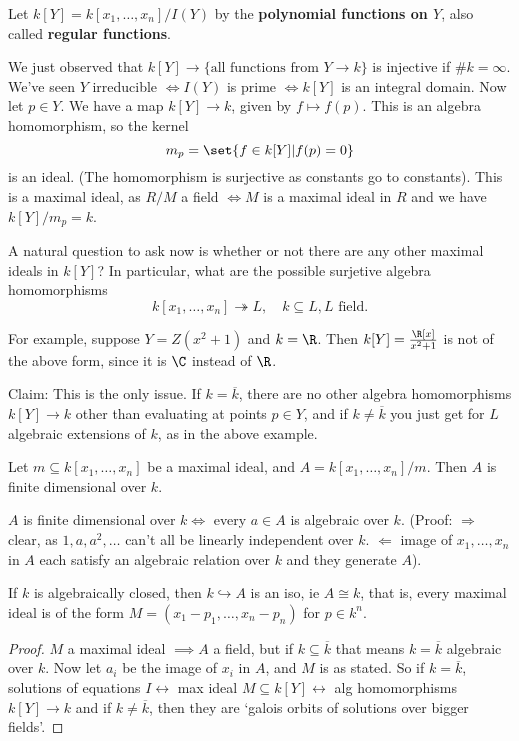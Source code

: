 \documentclass{article}
\begin{document}
\begin{defi}
    Let $k[Y] = k[x_1, \dotsc, x_n]/I(Y)$ by the \textbf{polynomial functions on $Y$}, also called \textbf{regular functions}.
\end{defi}
We just observed that $k[Y] \to \{\text{all functions from } Y \to k\}$ is injective if $\#k = \infty$.
We've seen $Y$ irreducible $\iff I(Y)$ is prime $\iff k[Y]$ is an integral domain.
Now let $p \in Y$. We have a map $k[Y] \to k$, given by $f \mapsto f(p)$.
This is an algebra homomorphism, so the kernel
\begin{equation*}
    m_p = \set{f \in k[Y] | f(p) = 0}
\end{equation*}
is an ideal. (The homomorphism is surjective as constants go to constants).
This is a maximal ideal, as $R/M$ a field $\iff M$ is a maximal ideal in $R$ and we have $k[Y]/m_p = k$.

A natural question to ask now is whether or not there are any other maximal ideals in $k[Y]$?
In particular, what are the possible surjetive algebra homomorphisms
\begin{equation*}
    k[x_1, \dotsc, x_n] \twoheadrightarrow L, \quad k \subseteq L, L \text{ field}.
\end{equation*}

For example, suppose $Y = Z(x^2+1)$ and $k=\R$. Then $k[Y] = \frac{\R[x]}{x^2 + 1}$ is not of the above form, since it is $\C$ instead of $\R$.

Claim: This is the only issue. If $k = \overline{k}$, there are no other algebra homomorphisms $k[Y] \to k$ other than evaluating at points $p \in Y$, and if $k \neq \overline{k}$ you just get for $L$ algebraic extensions of $k$, as in the above example.

\begin{thm}[Nullstellensatz, v1]
    Let $m \subseteq k[x_1, \dotsc, x_n]$ be a maximal ideal, and $A=k[x_1, \dotsc, x_n]/m$. Then $A$ is finite dimensional over $k$.
\end{thm}
\begin{remark}
    $A$ is finite dimensional over $k \iff$ every $a \in A$ is algebraic over $k$.
    (Proof: $\Rightarrow$ clear, as $1, a, a^2, \dotsc$ can't all be linearly independent over $k$. $\Leftarrow$ image of $x_1, \dotsc, x_n$ in $A$ each satisfy an algebraic relation over $k$ and they generate $A$).
\end{remark}
\begin{cor}
    If $k$ is algebraically closed, then $k \hookrightarrow A$ is an iso, ie $A \cong k$, that is, every maximal ideal is of the form $M= (x_1 - p_1, \dotsc, x_n - p_n)$ for $p \in k^n$.
\end{cor}
\begin{proof}
    $M$ a maximal ideal $\implies A$ a field, but if $k \subseteq \overline{k}$ that means $k = \overline{k}$ algebraic over $k$. Now let $a_i$ be the image of $x_i$ in $A$, and $M$ is as stated.
    So if $k = \overline{k}$, solutions of equations $I \longleftrightarrow$ max ideal $M \subseteq k[Y] \longleftrightarrow$ alg homomorphisms $k[Y] \to k$ and if $k \neq \overline{k}$, then they are `galois orbits of solutions over bigger fields'.
\end{proof}
\end{document}

